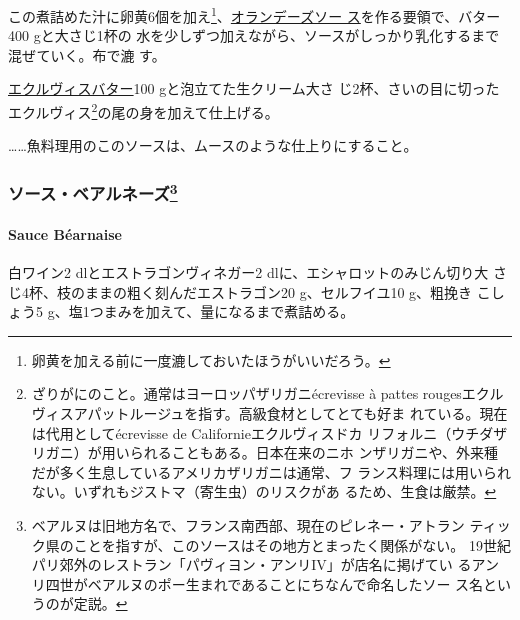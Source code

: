 \begin{recette}
この煮詰めた汁に卵黄6個を加え\footnote{卵黄を加える前に一度漉しておいたほうがいいだろう。}、\protect\hyperlink{sauce-hollandaise}{オランデーズソー
ス}を作る要領で、バター400 gと大さじ1\undemi{}杯の
水を少しずつ加えながら、ソースがしっかり乳化するまで混ぜていく。布で漉
す。

\protect\hyperlink{beurre-d-ecrevisse}{エクルヴィスバター}100
gと泡立てた生クリーム大さ じ2杯、さいの目に切ったエクルヴィス\footnote{ざりがにのこと。通常はヨーロッパザリガニécrevisse
  à pattes
  rougesエクルヴィスアパットルージュを指す。高級食材としてとても好ま
  れている。現在は代用としてécrevisse de Californieエクルヴィスドカ
  リフォルニ（ウチダザリガニ）が用いられることもある。日本在来のニホ
  ンザリガニや、外来種だが多く生息しているアメリカザリガニは通常、フ
  ランス料理には用いられない。いずれもジストマ（寄生虫）のリスクがあ
  るため、生食は厳禁。}の尾の身を加えて仕上げる。

\ldots{}\ldots{}魚料理用のこのソースは、ムースのような仕上りにすること。

\maeaki

\hypertarget{ux30bdux30fcux30b9ux30d9ux30a2ux30ebux30cdux30fcux30ba8}{%
\subsubsection[ソース・ベアルネーズ]{\texorpdfstring{ソース・ベアルネーズ\footnote{ベアルヌは旧地方名で、フランス南西部、現在のピレネー・アトラン
  ティック県のことを指すが、このソースはその地方とまったく関係がない。
  19世紀パリ郊外のレストラン「パヴィヨン・アンリIV」が店名に掲げてい
  るアンリ四世がベアルヌのポー生まれであることにちなんで命名したソー
  ス名というのが定説。}}{ソース・ベアルネーズ}}\label{ux30bdux30fcux30b9ux30d9ux30a2ux30ebux30cdux30fcux30ba8}}

\hypertarget{sauce-bearnaise}{%
\paragraph{Sauce Béarnaise}\label{sauce-bearnaise}}


白ワイン2 dlとエストラゴンヴィネガー2 dlに、エシャロットのみじん切り大
さじ4杯、枝のままの粗く刻んだエストラゴン20 g、セルフイユ10 g、粗挽き
こしょう5 g、塩1つまみを加えて、\untiers{}量になるまで煮詰める。


\end{recette}
